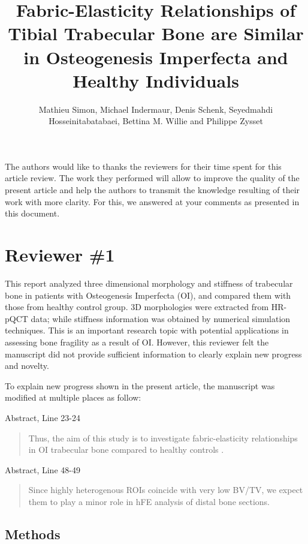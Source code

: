 \documentclass{AR2RC}
\title{Fabric-Elasticity Relationships of Tibial Trabecular Bone are Similar in Osteogenesis Imperfecta and Healthy Individuals}
\author{Mathieu Simon, Michael Indermaur, Denis Schenk, Seyedmahdi Hosseinitabatabaei, Bettina	M. Willie and Philippe Zysset}
\begin{document}
\maketitle

\vspace{1em}The authors would like to thanks the reviewers for their time spent for this article review. The work they performed will allow to improve the quality of the present article and help the authors to transmit the knowledge resulting of their work with more clarity. For this, we answered at your comments as presented in this document.

\section{Reviewer \#1}

\RC This report analyzed three dimensional morphology and stiffness of trabecular bone in patients with Osteogenesis Imperfecta (OI), and compared them with those from healthy control group. 3D morphologies were extracted from HR-pQCT data; while stiffness information was obtained by numerical simulation techniques. This is an important research topic with potential applications in assessing bone fragility as a result of OI. However, this reviewer felt the manuscript did not provide sufficient information to clearly explain new progress and novelty.

\AR To explain new progress shown in the present article, the manuscript was modified at multiple places as follow:\par

Abstract, Line 23-24
\begin{quote}
	Thus, the aim of this study is to investigate fabric-elasticity relationships in OI trabecular bone compared to healthy controls .
\end{quote}

Abstract, Line 48-49
\begin{quote}
	 Since highly heterogenous ROIs coincide with very low BV/TV, we expect them to play a minor role in hFE analysis of distal bone sections. 
\end{quote}

\subsection{Methods}
\end{document}

